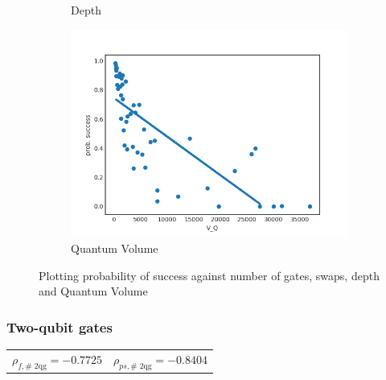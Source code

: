 \documentclass[11pt]{article}
\begin{document}
\begin{figure}[H]
\begin{subfigure}[b]{0.5\linewidth}
    \caption{Depth} 
    \label{fig:ps_d_1000} 
  \end{subfigure}%
  \begin{subfigure}[b]{0.5\linewidth}
    \centering
    \includegraphics[width=0.75\linewidth]{ps_q_1000_0_005} 
    \caption{Quantum Volume} 
    \label{fig:ps_q_1000} 
  \end{subfigure} 
  \caption{Plotting probability of success against number of gates, swaps, depth and Quantum Volume}
  \label{fig:ps_1000} 
\end{figure}

\subsubsection{Two-qubit gates}
\label{sec:org1eb83ea}

\begin{center}
\begin{tabular}{ll}
\(\rho _{f,\text{# 2qg}} = -0.7725\) & \(\rho _{ps,\text{# 2qg}} = -0.8404\)\\
\end{tabular}
\end{center}
\end{document}
